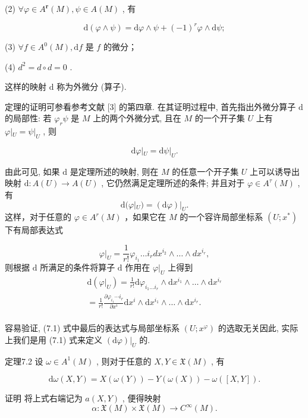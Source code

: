 (2)  $\forall \varphi \in A^{\mathbf{r}}(M), \psi \in A(M)$ , 有

$$
\mathrm {d} (\varphi \wedge \psi) = \mathrm {d} \varphi \wedge \psi + (- 1) ^ {r} \varphi \wedge \mathrm {d} \psi ;
$$

(3)  $\forall f\in A^0 (M),\mathrm{d}f$  是  $f$  的微分；

(4)  $d^2 = d \circ d = 0$ .

这样的映射  $\mathrm{d}$  称为外微分 (算子).

定理的证明可参看参考文献 [3] 的第四章. 在其证明过程中, 首先指出外微分算子  $\mathrm{d}$  的局部性: 若  $\varphi_r \psi$  是  $M$  上的两个外微分式, 且在  $M$  的一个开子集  $U$  上有  $\varphi|_U = \psi|_U$ , 则

$$
\mathrm {d} \varphi | _ {U} = \mathrm {d} \psi | _ {U}.
$$

由此可见, 如果  $\mathrm{d}$  是定理所述的映射, 则在  $M$  的任意一个开子集  $U$  上可以诱导出映射  $\mathrm{d}: A(U) \to A(U)$ , 它仍然满足定理所述的条件; 并且对于  $\varphi \in A^{\tau}(M)$ , 有
$$
\mathrm {d} (\varphi | _ {U}) = (\mathrm {d} \varphi) | _ {U}.
$$
这样，对于任意的  $\varphi \in A^r (M)$  ，如果它在  $M$  的一个容许局部坐标系 $(U;x^{*})$  下有局部表达式

$$
\varphi | _ {U} = \frac {1}{r !} \varphi_ {i _ {1}} \dots i _ {r} d x ^ {i _ {2}} \wedge \dots \wedge d x ^ {i _ {r}},
$$
则根据  $\mathrm{d}$  所满足的条件将算子  $\mathrm{d}$  作用在  $\varphi|_{U}$  上得到
$$
\begin{array}{l} \mathrm {d} (\varphi | _ {U}) = \frac {1}{r !} \mathrm {d} \varphi_ {i _ {1} \dots i _ {r}} \wedge \mathrm {d} x ^ {i _ {1}} \wedge \dots \wedge \mathrm {d} x ^ {i _ {r}} \\ = \frac {1}{r !} \frac {\partial \varphi_ {i _ {1}} \cdots i _ {r}}{\partial x ^ {i}} \mathrm {d} x ^ {i} \wedge \mathrm {d} x ^ {i _ {1}} \wedge \dots \wedge \mathrm {d} x ^ {i _ {r}}. %
\\ \end{array}
$$

容易验证, (7.1) 式中最后的表达式与局部坐标系  $(U; x^{\varphi})$  的选取无关因此, 实际上我们是用 (7.1) 式来定义  $(\mathrm{d}\varphi)|_{U}$  的.

定理7.2 设  $\omega \in A^{1}(M)$ , 则对于任意的  $X, Y \in \mathfrak{X}(M)$ , 有

$$
\mathrm {d} \omega (X, Y) = X (\omega (Y)) - Y (\omega (X)) - \omega ([ X, Y ]).
$$

证明 将上式右端记为  $a(X,Y)$ , 便得映射
$$
\alpha : \mathfrak {X} (M) \times \mathfrak {X} (M) \rightarrow C ^ {\infty} (M).
$$

